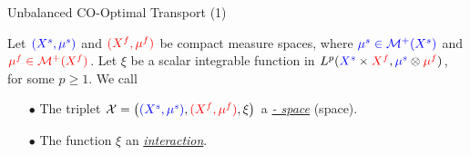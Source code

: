 \documentclass{beamer}
\newcommand{\cX}{\mathcal X}
\newcommand{\cM}{\mathcal M}
\newcommand{\sfspace}{{\color{blue}{s.}}{\color{red}{f. }}}
\begin{document}
\begin{frame}{Unbalanced CO-Optimal Transport (1)}
\scriptsize
  \begin{definition}
    Let ${\color{blue}{(X^s, \mu^s)}}$ and ${\color{red}{(X^f, \mu^f)}}$ be compact measure spaces, where ${\color{blue}{\mu^s \in \cM^+(X^s)}}$ and ${\color{red}{\mu^f \in \cM^+(X^f)}}$. Let $\xi$ be a scalar integrable function in $L^p({\color{blue}{X^s}} \times {\color{red}{X^f}}, {\color{blue}{\mu^s}} \otimes {\color{red}{\mu^f}})$, for some $p \geq 1$. We call
    \begin{itemize}
      \setlength\itemindent{10pt}
      \item[$\bullet$] The triplet
      $\cX = \left({\color{blue}{(X^s, \mu^s)}}, {\color{red}{(X^f, \mu^f)}}, \xi \right)$
      a \underline{\textit{{\color{blue}{sample}} - {\color{red}{feature}} space}}
      (\sfspace space).

      \item[$\bullet$] The function $\xi$ an \textit{\underline{interaction}}.
    \end{itemize}
  \end{definition}
  \vspace{-0.2cm}



\end{frame}
\end{document}
